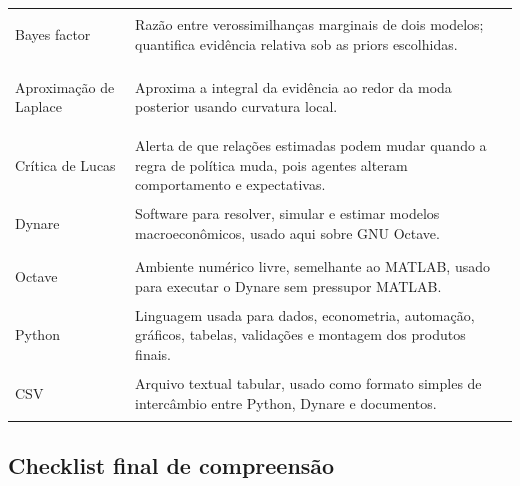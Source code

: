 \documentclass[11pt,a4paper]{article}
\begin{document}
\begin{longtable}{>{\bfseries\raggedright\arraybackslash}p{}>{\raggedright\arraybackslash}p{}}
Bayes factor & Razão entre verossimilhanças marginais de dois modelos; quantifica evidência
relativa sob as priors escolhidas. \\
Aproximação de Laplace & Aproxima a integral da evidência ao redor da moda posterior usando
curvatura local. \\
Crítica de Lucas & Alerta de que relações estimadas podem mudar quando a regra de política muda,
pois agentes alteram comportamento e expectativas. \\
Dynare & Software para resolver, simular e estimar modelos macroeconômicos, usado aqui sobre GNU
Octave. \\
Octave & Ambiente numérico livre, semelhante ao MATLAB, usado para executar o Dynare sem pressupor
MATLAB. \\
Python & Linguagem usada para dados, econometria, automação, gráficos, tabelas, validações e
montagem dos produtos finais. \\
CSV & Arquivo textual tabular, usado como formato simples de intercâmbio entre Python, Dynare e
documentos. \\
\bottomrule
\end{longtable}

\subsection{Checklist final de compreensão}
\end{document}
